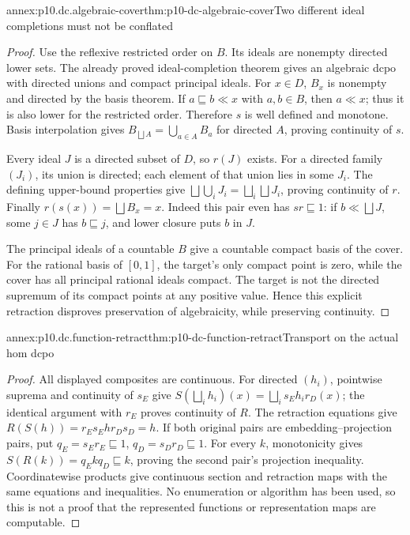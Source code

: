 \begin{annexitem}{annex:p10.dc.algebraic-cover}{thm:p10-dc-algebraic-cover}{Two different ideal completions must not be conflated}
\begin{proof}
Use the reflexive restricted order on \(B\). Its ideals are nonempty
directed lower sets. The already proved ideal-completion theorem gives
an algebraic dcpo with directed unions and compact principal ideals.
For \(x\in D\), \(B_x\) is nonempty and directed by the basis theorem.
If \(a\sqsubseteq b\ll x\) with \(a,b\in B\), then \(a\ll x\);
thus it is also lower for the restricted order. Therefore \(s\) is
well defined and monotone. Basis interpolation gives
\(B_{\bigsqcup A}=\bigcup_{a\in A}B_a\) for directed \(A\), proving
continuity of \(s\).

Every ideal \(J\) is a directed subset of \(D\), so \(r(J)\) exists.
For a directed family \((J_i)\), its union is directed; each element
of that union lies in some \(J_i\). The defining upper-bound properties
give \(\bigsqcup\bigcup_iJ_i=\bigsqcup_i\bigsqcup J_i\), proving
continuity of \(r\). Finally \(r(s(x))=\bigsqcup B_x=x\).
Indeed this pair even has \(sr\sqsubseteq1\): if
\(b\ll\bigsqcup J\), some \(j\in J\) has \(b\sqsubseteq j\),
and lower closure puts \(b\) in \(J\).

The principal ideals of a countable \(B\) give a countable compact
basis of the cover. For the rational basis of \([0,1]\), the target's
only compact point is zero, while the cover has all principal rational
ideals compact. The target is not the directed supremum of its compact
points at any positive value. Hence this explicit retraction disproves
preservation of algebraicity, while preserving continuity.
\end{proof}
\end{annexitem}

\begin{annexitem}{annex:p10.dc.function-retract}{thm:p10-dc-function-retract}{Transport on the actual hom dcpo}
\begin{proof}
All displayed composites are continuous. For directed \((h_i)\),
pointwise suprema and continuity of \(s_E\) give
\(S(\bigsqcup_i h_i)(x)=\bigsqcup_i s_Eh_i r_D(x)\);
the identical argument with \(r_E\) proves continuity of \(R\).
The retraction equations give
\(R(S(h))=r_Es_Eh r_Ds_D=h\).
If both original pairs are embedding--projection pairs, put
\(q_E=s_Er_E\sqsubseteq1\), \(q_D=s_Dr_D\sqsubseteq1\).
For every \(k\), monotonicity gives
\(S(R(k))=q_Ekq_D\sqsubseteq k\), proving the second pair's
projection inequality. Coordinatewise products give continuous section
and retraction maps with the same equations and inequalities.
No enumeration or algorithm has been used, so this is not a proof that
the represented functions or representation maps are computable.
\end{proof}
\end{annexitem}

